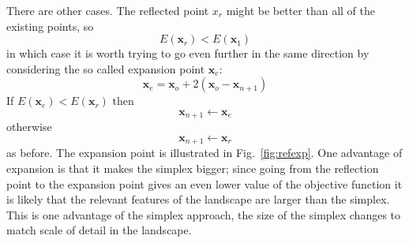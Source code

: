 \documentclass[12pt]{article}
\begin{document}
There are other cases. The reflected point $x_r$ might be better than all
of the existing points, so
\begin{equation}
E(\mathbf{x}_r)<E(\mathbf{x}_1)
\end{equation}
in which case it is worth trying to go even further in the same
direction by considering the so called expansion point $\mathbf{x}_e$:
\begin{equation}
\mathbf{x}_e=\mathbf{x}_o+2(\mathbf{x}_o-\mathbf{x}_{n+1})
\end{equation}
If $E(\mathbf{x}_e)<E(\mathbf{x}_r)$ then
\begin{equation}
\mathbf{x}_{n+1}\leftarrow \mathbf{x}_e
\end{equation}
otherwise
\begin{equation}
\mathbf{x}_{n+1}\leftarrow \mathbf{x}_r
\end{equation}
as before. The expansion point is illustrated in
Fig.~\ref{fig:refexp}. One advantage of expansion is that it makes the
simplex bigger; since going from the reflection point to the expansion
point gives an even lower value of the objective function it is likely
that the relevant features of the landscape are larger than the
simplex. This is one advantage of the simplex approach, the size of
the simplex changes to match scale of detail in the landscape.
\end{document}
